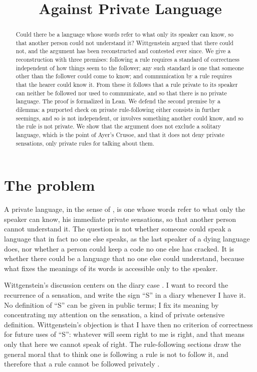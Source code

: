 \documentclass{situationist-preprint}
\title{Against Private Language}
\begin{document}
\maketitle

\begin{abstract}
Could there be a language whose words refer to what only its speaker can know, so that another person could not understand it? Wittgenstein argued that there could not, and the argument has been reconstructed and contested ever since. We give a reconstruction with three premises: following a rule requires a standard of correctness independent of how things seem to the follower; any such standard is one that someone other than the follower could come to know; and communication by a rule requires that the hearer could know it. From these it follows that a rule private to its speaker can neither be followed nor used to communicate, and so that there is no private language. The proof is formalized in Lean. We defend the second premise by a dilemma: a purported check on private rule-following either consists in further seemings, and so is not independent, or involves something another could know, and so the rule is not private. We show that the argument does not exclude a solitary language, which is the point of Ayer's Crusoe, and that it does not deny private sensations, only private rules for talking about them.
\end{abstract}

\section{The problem}

A private language, in the sense of \citet[\S243]{Wittgenstein1953}, is one whose words refer to what only the speaker can know, his immediate private sensations, so that another person cannot understand it. The question is not whether someone could speak a language that in fact no one else speaks, as the last speaker of a dying language does, nor whether a person could keep a code no one else has cracked. It is whether there could be a language that no one else could understand, because what fixes the meanings of its words is accessible only to the speaker.

Wittgenstein's discussion centers on the diary case \citep[\S258]{Wittgenstein1953}. I want to record the recurrence of a sensation, and write the sign \enquote{S} in a diary whenever I have it. No definition of \enquote{S} can be given in public terms; I fix its meaning by concentrating my attention on the sensation, a kind of private ostensive definition. Wittgenstein's objection is that I have then no criterion of correctness for future uses of \enquote{S}: whatever will seem right to me is right, and that means only that here we cannot speak of right. The rule-following sections draw the general moral that to think one is following a rule is not to follow it, and therefore that a rule cannot be followed privately \citep[\S202]{Wittgenstein1953}.
\end{document}
